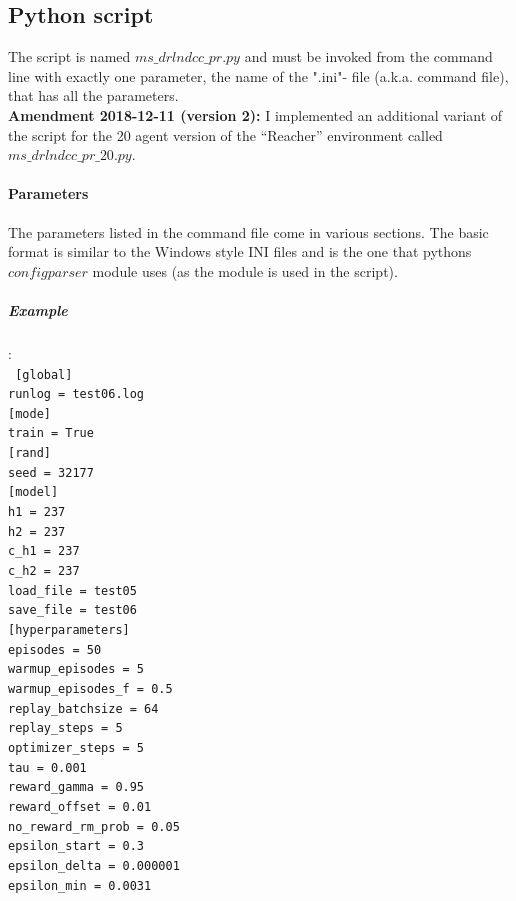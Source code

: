 \documentclass[a4paper]{article}
\begin{document}
\subsection{Python script}
The script is named $ms\_drlndcc\_pr.py$ and must be invoked from the command
line with exactly one parameter, the name of the ".ini"- file (a.k.a. command file),
that has all the parameters.
\\
\textbf{Amendment 2018-12-11 (version 2):} I implemented an additional variant
of the script for the 20 agent version of the \enquote{Reacher} environment
called $ms\_drlndcc\_pr\_20.py$.

\paragraph{Parameters}
The parameters listed in the command file come in various sections. The basic format
is similar to the Windows style INI files and is the one that pythons $configparser$
module uses (as the module is used in the script).

\subparagraph{Example}
:\\
\tiny
\texttt{
{[global]} \\
runlog = test06.log \\
{[mode]} \\
train = True \\
{[rand]} \\
seed = 32177 \\
{[model]} \\
h1 = 237 \\
h2 = 237 \\
c\_h1 = 237 \\
c\_h2 = 237 \\
load\_file = test05 \\
save\_file = test06 \\
{[hyperparameters]} \\
episodes           = 50 \\
warmup\_episodes    = 5 \\
warmup\_episodes\_f  = 0.5 \\
replay\_batchsize   = 64 \\
replay\_steps       = 5 \\
optimizer\_steps    = 5 \\
tau                = 0.001 \\
reward\_gamma       = 0.95 \\
reward\_offset      = 0.01 \\
no\_reward\_rm\_prob  = 0.05 \\
epsilon\_start      = 0.3 \\
epsilon\_delta      = 0.000001 \\
epsilon\_min        = 0.0031
}
\end{document}
